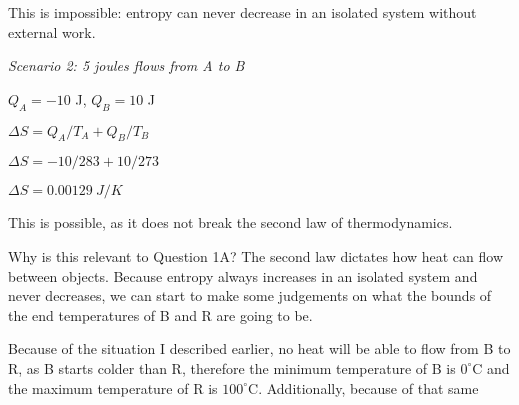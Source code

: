 \documentclass[12pt,letter]{article}
\begin{document}
\bigskip

This is impossible: entropy can never decrease in an isolated system without external 
work.

\bigskip

\emph{Scenario 2: 5 joules flows from A to B}

\bigskip

{\centering
    $Q_A = -10$ J, $Q_B = 10$ J

    \bigskip

    $\Delta S = Q_A/T_A + Q_B/T_B$

    \bigskip

    $\Delta S = -10/283 + 10/273$

    \bigskip

    $\Delta S = 0.00129\ J/K$ 

}

\bigskip

This is possible, as it does not break the second law of thermodynamics.

\bigskip

Why is this relevant to Question 1A?
The second law dictates how heat can flow between objects.
Because entropy always increases in an isolated system and never decreases, we can
start to make some judgements on what the bounds of the end temperatures of B and R
are going to be.

\pagebreak

Because of the situation I described earlier, no heat will be able to flow from B
to R, as B starts colder than R, therefore the minimum temperature of B is $0^{\circ}$C
and the maximum temperature of R is $100^{\circ}$C.
Additionally, because of that same 
\end{document}
